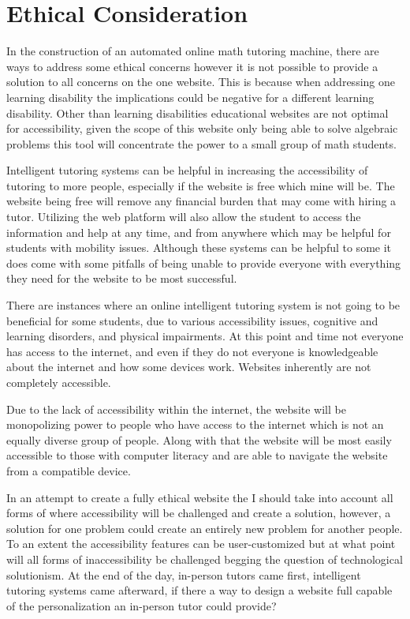 \documentclass[10pt,twocolumn]{article}
\begin{document}
\section{Ethical Consideration}
 In the construction of an automated online math tutoring machine, there are ways to address some ethical concerns however it is not possible to provide a solution to all concerns on the one website. This is because when addressing one learning disability the implications could be negative for a different learning disability. Other than learning disabilities educational websites are not optimal for accessibility, given the scope of this website only being able to solve algebraic problems this tool will concentrate the power to a small group of math students. 

Intelligent tutoring systems can be helpful in increasing the accessibility of tutoring to more people, especially if the website is free which mine will be. The website being free will remove any financial burden that may come with hiring a tutor. Utilizing the web platform will also allow the student to access the information and help at any time, and from anywhere which may be helpful for students with mobility issues. Although these systems can be helpful to some it does come with some pitfalls of being unable to provide everyone with everything they need for the website to be most successful. 

There are instances where an online intelligent tutoring system is not going to be beneficial for some students, due to various accessibility issues, cognitive and learning disorders, and physical impairments. At this point and time not everyone has access to the internet, and even if they do not everyone is knowledgeable about the internet and how some devices work. Websites inherently are not completely accessible.

Due to the lack of accessibility within the internet, the website will be monopolizing power to people who have access to the internet which is not an equally diverse group of people. Along with that the website will be most easily accessible to those with computer literacy and are able to navigate the website from a compatible device. 

In an attempt to create a fully ethical website the I should take into account all forms of where accessibility will be challenged and create a solution, however, a solution for one problem could create an entirely new problem for another people. To an extent the accessibility features can be user-customized but at what point will all forms of inaccessibility be challenged begging the question of technological solutionism. At the end of the day, in-person tutors came first, intelligent tutoring systems came afterward, if there a way to design a website full capable of the personalization an in-person tutor could provide?
\end{document}
